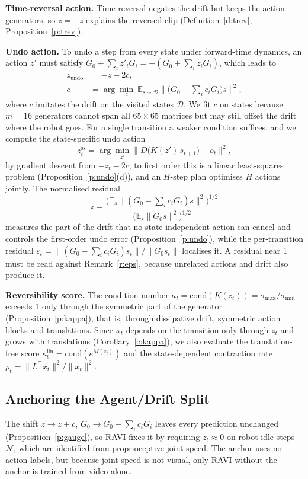 \documentclass{jcse}
\newcommand{\method}{RAVI}
\newcommand{\zb}{\bar{z}}
\newcommand{\zundo}{z_{\mathrm{undo}}}
\newcommand{\cond}{\mathrm{cond}}
\newcommand{\zss}{z^{\mathrm{ss}}}
\newcommand{\klin}{\kappa^{\mathrm{lin}}}
\begin{document}
\textbf{Time-reversal action.} Time reversal negates the drift but keeps the action generators, so $\zb=-z$ explains the reversed clip (Definition~\ref{d:trev}, Proposition~\ref{p:trev}).

\textbf{Undo action.} To undo a step from every state under forward-time dynamics, an action $z'$ must satisfy $G_0+\sum_iz'_iG_i=-(G_0+\sum_iz_iG_i)$, which leads to
\begin{align}
\zundo&=-z-2c,\nonumber\\
c&=\arg\min_c\ \mathbb{E}_{s\sim\mathcal{D}}\Big\|\Big(G_0-\sum_ic_iG_i\Big)s\Big\|^2,
\label{e:undo}
\end{align}
where $c$ imitates the drift on the visited states $\mathcal{D}$.
We fit $c$ on states because $m=16$ generators cannot span all $65\times65$ matrices but may still offset the drift where the robot goes.
For a single transition a weaker condition suffices, and we compute the state-specific undo action
\begin{equation}
\zss_t=\arg\min_{z'}\big\|D\big(K(z')\,s_{t+1}\big)-o_t\big\|^2,
\label{e:undoss}
\end{equation}
by gradient descent from $-z_t-2c$; to first order this is a linear least-squares problem (Proposition~\ref{p:undo}(d)), and an $H$-step plan optimises $H$ actions jointly.
The normalised residual
\begin{equation}
\varepsilon=\frac{\big(\mathbb{E}_s\|(G_0-\sum_ic_iG_i)s\|^2\big)^{1/2}}{\big(\mathbb{E}_s\|G_0s\|^2\big)^{1/2}}
\label{e:residual}
\end{equation}
measures the part of the drift that no state-independent action can cancel and controls the first-order undo error (Proposition~\ref{p:undo}), while the per-transition residual $\varepsilon_t=\|(G_0-\sum_ic_iG_i)s_t\|/\|G_0s_t\|$ localises it.
A residual near 1 must be read against Remark~\ref{r:eps}, because unrelated actions and drift also produce it.

\textbf{Reversibility score.} The condition number $\kappa_t=\cond(K(z_t))=\sigma_{\max}/\sigma_{\min}$ exceeds 1 only through the symmetric part of the generator (Proposition~\ref{p:kappa}), that is, through dissipative drift, symmetric action blocks and translations.
Since $\kappa_t$ depends on the transition only through $z_t$ and grows with translations (Corollary~\ref{c:kappa}), we also evaluate the translation-free score $\klin_t=\cond(e^{M(z_t)})$ and the state-dependent contraction rate $\rho_t=\|L^\top x_t\|^2/\|x_t\|^2$.

\subsection{Anchoring the Agent/Drift Split} \label{s:anchor}
The shift $z\to z+c$, $G_0\to G_0-\sum_ic_iG_i$ leaves every prediction unchanged (Proposition~\ref{p:gauge}), so {\method} fixes it by requiring $z_t\approx0$ on robot-idle steps $\mathcal{N}$, which are identified from proprioceptive joint speed.
The anchor uses no action labels, but because joint speed is not visual, only {\method} without the anchor is trained from video alone.
\end{document}
